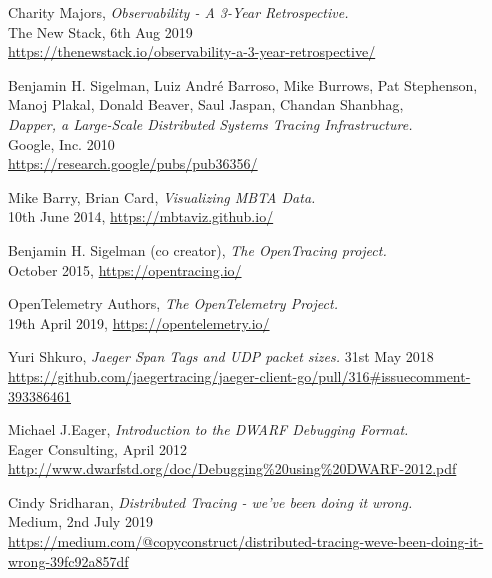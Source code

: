 \documentclass[12pt,pdftex,titlepage]{report}
\begin{document}
    \begin{thebibliography}{69}

        Charity Majors, \textit{Observability - A 3-Year Retrospective.} \\
        The New Stack, 6th Aug 2019 \\
        \url{https://thenewstack.io/observability-a-3-year-retrospective/}

        Benjamin H. Sigelman, Luiz André Barroso, Mike Burrows, Pat Stephenson, Manoj Plakal, Donald Beaver, Saul Jaspan, Chandan Shanbhag, \\
        \textit{Dapper, a Large-Scale Distributed Systems Tracing Infrastructure.} \\
        Google, Inc. 2010 \\
        \url{https://research.google/pubs/pub36356/}

        Mike Barry, Brian Card, \textit{Visualizing MBTA Data.} \\
        10th June 2014, \url{https://mbtaviz.github.io/}

        Benjamin H. Sigelman (co creator), \textit{The OpenTracing project.} \\
        October 2015, \url{https://opentracing.io/}

        OpenTelemetry Authors, \textit{The OpenTelemetry Project.} \\
        19th April 2019, \url{https://opentelemetry.io/}

        Yuri Shkuro, \textit{Jaeger Span Tags and UDP packet sizes.}
        31st May 2018 \\
        \url{https://github.com/jaegertracing/jaeger-client-go/pull/316#issuecomment-393386461}

        Michael J.Eager, \textit{Introduction to the DWARF Debugging Format.} \\
        Eager Consulting, April 2012 \\
        \url{http://www.dwarfstd.org/doc/Debugging%20using%20DWARF-2012.pdf}

        Cindy Sridharan, \textit{Distributed Tracing - we've been doing it wrong.} \\
        Medium, 2nd July 2019 \\
        \url{https://medium.com/@copyconstruct/distributed-tracing-weve-been-doing-it-wrong-39fc92a857df}


\end{thebibliography}
\end{document}
